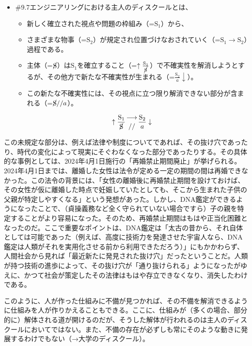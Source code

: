\begin{note}{}
  \begin{itemize}
    \tightlist
    \item{\#9.7}エンジニアリングにおける主人のディスクールとは、
      \begin{itemize}
        \tightlist
        \item 新しく確立された視点や問題の枠組み（=$\textrm{S}_1$）から、
        \item さまざまな物事（=$\textrm{S}_2$）が規定され位置づけなおされていく（=$\textrm{S}_1\rightarrow\textrm{S}_2$）過程である。
        \item 主体（=$\cancel{\textrm{S}}$）は$\textrm{S}_1$を確立すること（=$\uparrow\frac{\mathrm{S_1}}{\cancel{\textrm{S}}}$）で不確実性を解消しようとするが、その他方で新たな不確実性が生まれる（=$\frac{\mathrm{S_2}}{a}\downarrow$）。
        \item この新たな不確実性には、その視点に立つ限り解消できない部分が含まれる（=$\cancel{\textrm{S}}//a$）。
      \end{itemize}

$$
\uparrow\frac{\mathrm{S_1}}{\cancel{\textrm{S}}}\genfrac{}{}{0pt}{}{\longrightarrow}{//}\frac{\mathrm{S_2}}{a}\downarrow
$$
  \end{itemize}
\end{note}

この未規定な部分は、例えば法律や制度についてであれば、その抜け穴であったり、時代の変化によって現実にそぐわなくなった部分であったりする。その具体的な事例としては、2024年4月1日施行の「再婚禁止期間廃止」が挙げられる。2024年4月1日までは、離婚した女性は法令が定める一定の期間の間は再婚できなかった。この法令の背景には、「女性の離婚後に再婚禁止期間を設けておけば、その女性が仮に離婚した時点で妊娠していたとしても、そこから生まれた子供の父親が特定しやすくなる」という発想があった。しかし、DNA鑑定ができるようになったことで、（貞操義務など全く守られていない場合ですら）子の親を特定することがより容易になった。そのため、再婚禁止期間はもはや正当化困難となったのだ。ここで重要なポイントは、DNA鑑定は「太古の昔から、それ自体としては可能であった（例えば、高度に技術力を発達させた宇宙人なら、DNA鑑定は人類がそれを実用化させる前から利用できただろう）」にもかかわらず、人間社会から見れば「最近新たに発見された抜け穴」だったということだ。人類が持つ技術の進歩によって、その抜け穴が「通り抜けられる」ようになったがゆえに、かつて社会が策定したその法律はもはや存立できなくなり、消失したわけである。

このように、人が作った仕組みに不備が見つかれば、その不備を解消できるように仕組みを人が作りかえることもできる。ここに、仕組みが（多くの場合、部分的に）解体される道が開けるのだが、そうした解体が行われるのは主人のディスクールにおいてではない。また、不備の存在が必ずしも常にそのような動きに発展するわけでもない（→大学のディスクール）。

